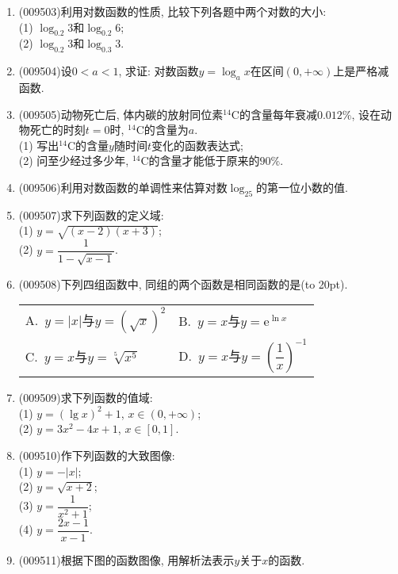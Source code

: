 \documentclass[10pt,a4paper]{article}
\newcommand{\bracket}[1]{(\hbox to #1pt{})}
\newcommand{\twoch}[4]{\par\begin{tabular}{p{.46\textwidth}p{.46\textwidth}}
A.~#1& B.~#2\\
C.~#3& D.~#4
\end{tabular}}
\begin{document}
\begin{enumerate}[1.]
\item {\tiny (009503)}利用对数函数的性质, 比较下列各题中两个对数的大小:\\
(1) $\log_{0.2}3$和$\log_{0.2}6$;\\
(2) $\log_{0.2}3$和$\log_{0.3}3$.
\item {\tiny (009504)}设$0<a<1$, 求证: 对数函数$y=\log_ax$在区间$(0, +\infty)$上是严格减函数.
\item {\tiny (009505)}动物死亡后, 体内碳的放射同位素$^{14}\text{C}$的含量每年衰减$0.012\%$, 设在动物死亡的时刻$t=0$时, $^{14}\text{C}$的含量为$a$.\\
(1) 写出$^{14}\text{C}$的含量$y$随时间$t$变化的函数表达式;\\
(2) 问至少经过多少年, $^{14}\text{C}$的含量才能低于原来的$90\%$.
\item {\tiny (009506)}利用对数函数的单调性来估算对数$\log_25$的第一位小数的值.
\item {\tiny (009507)}求下列函数的定义域:\\
(1) $y=\sqrt{(x-2)(x+3)}$;\\
(2) $y=\dfrac{1}{1-\sqrt{x-1}}$.
\item {\tiny (009508)}下列四组函数中, 同组的两个函数是相同函数的是\bracket{20}.
\twoch{$y=|x|$与$y=(\sqrt x)^2$}{$y=x$与$y=\mathrm{e}^{\ln x}$}{$y=x$与$y=\sqrt[5]{x^5}$}{$y=x$与$y=(\dfrac 1x)^{-1}$}
\item {\tiny (009509)}求下列函数的值域:\\
(1) $y=(\lg x)^2+1$, $x\in (0, +\infty)$;\\
(2) $y=3x^2-4x+1$, $x\in [0, 1]$.
\item {\tiny (009510)}作下列函数的大致图像:\\
(1) $y=-|x|$;\\
(2) $y= \sqrt{x+2}$;\\
(3) $y=\dfrac1{x^2+1}$;\\
(4) $y=\dfrac{2x-1}{x-1}$.
\item {\tiny (009511)}根据下图的函数图像, 用解析法表示$y$关于$x$的函数.
\begin{center}
\end{center}
\end{enumerate}
\end{document}
